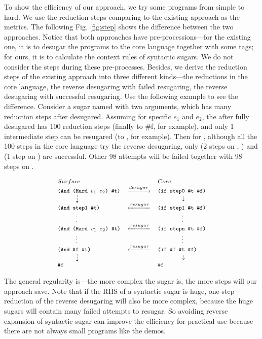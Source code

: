 To show the efficiency of our approach, we try some programs from simple to hard. We use the reduction steps comparing to the existing approach as the metrics. The following Fig. \ref{fig:step} shows the difference between the two approaches. Notice that both approaches have pre-processions---for the existing one, it is to desugar the programs to the core language together with some tags; for ours, it is to calculate the context rules of syntactic sugars. We do not consider the steps during these pre-processes. Besides, we derive the reduction steps of the existing approach into three different kinds---the reductions in the core language, the reverse desugaring with failed resugaring, the reverse desugaring with successful resugaring.  Use the following example to see the difference. Consider a sugar named  with two arguments, which has many reduction steps after desugared. Assuming for specific $e_1$ and $e_2$, the  after fully desugared has 100 reduction steps (finally to \#f, for example), and only 1 intermediate step can be resugared (to , for example). Then for , although all the 100 steps in the core language try the reverse desugaring, only  (2 steps on , ) and  (1 step on ) are successful. Other 98 attempts will be failed together with 98 steps on .

\[
{\footnotesize
	\begin{array}{lcl}
	Surface&&Core\\
	\Code{(And (Hard $e_1$ $e_2$) \#t)}&\xrightarrow{desugar}&\Code{(if step0 \#t \#f)}\\
	\qquad\quad\dashdownarrow& &\qquad\qquad\downarrow\\
	\Code{(And step1 \#t)}&\xleftarrow{resugar}&\Code{(if step1 \#t \#f)}\\
	\qquad\quad\vdots& &\qquad\qquad\vdots\\
	\Code{(And (Hard $v_1$ $e_2$) \#t)}&\xleftarrow{resugar}&\Code{(if stepn \#t \#f)}\\
	\qquad\quad\vdots& &\qquad\qquad\vdots\\
	\Code{(And \#f \#t)}&\xleftarrow{resugar}& \Code{(if \#f \#t \#f)}\\
	\qquad\quad\dashdownarrow& &\qquad\qquad\downarrow\\
	\Code{\#f}&& \Code{\#f}\\
\end{array}
}
\]


The general regularity is---the more complex the sugar is, the more steps will our approach save. Note that if the RHS of a syntactic sugar is huge, one-step reduction of the reverse desugaring will also be more complex, because the huge sugars will contain many failed attempts to resugar. So avoiding reverse expansion of syntactic sugar can improve the efficiency for practical use because there are not always small programs like the demos.
